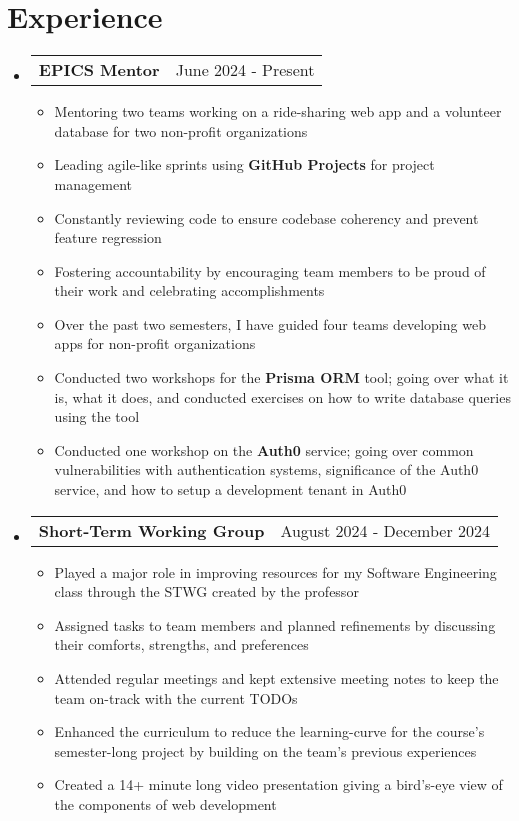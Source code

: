 \documentclass[letterpaper,11pt]{article}
\makeatletter
\newcommand{\resumeItem}[1]{
  \item\small{
    {#1 \vspace{-2pt}}
  }
}
\newcommand{\resumeProjectHeading}[2]{
    \item
    \begin{tabular*}{0.97\textwidth}{l@{\extracolsep{\fill}}r}
      \small#1 & #2 \\
    \end{tabular*}\vspace{-7pt}
}
\newcommand{\resumeSubHeadingListStart}{\begin{itemize}[leftmargin=0.15in, label={}]}
\newcommand{\resumeSubHeadingListEnd}{\end{itemize}}
\newcommand{\resumeItemListStart}{\begin{itemize}}
\newcommand{\resumeItemListEnd}{\end{itemize}\vspace{-5pt}}
\makeatother
\begin{document}
\section{Experience}
  \resumeSubHeadingListStart
    \resumeProjectHeading{\textbf{EPICS Mentor}}{June 2024 - Present}
      \resumeItemListStart
        \resumeItem{Mentoring two teams working on a ride-sharing web app and a volunteer database for two non-profit organizations}
        \resumeItem{Leading agile-like sprints using \textbf{GitHub Projects} for project management}
        \resumeItem{Constantly reviewing code to ensure codebase coherency and prevent feature regression }
        \resumeItem{Fostering accountability by encouraging team members to be proud of their work and celebrating accomplishments}
        \resumeItem{Over the past two semesters, I have guided four teams developing web apps for non-profit organizations}
        \resumeItem{Conducted two workshops for the \textbf{Prisma ORM} tool; going over what it is, what it does, and conducted exercises on how to write database queries using the tool}
        \resumeItem{Conducted one workshop on the \textbf{Auth0} service; going over common vulnerabilities with authentication systems, significance of the Auth0 service, and how to setup a development tenant in Auth0}
      \resumeItemListEnd
  \resumeSubHeadingListEnd

  \resumeSubHeadingListStart
    \resumeProjectHeading{\textbf{Short-Term Working Group}}{August 2024 - December 2024}
      \resumeItemListStart
        \resumeItem{Played a major role in improving resources for my Software Engineering class through the STWG created by the professor}
        \resumeItem{Assigned tasks to team members and planned refinements by discussing their comforts, strengths, and preferences}
        \resumeItem{Attended regular meetings and kept extensive meeting notes to keep the team on-track with the current TODOs}
        \resumeItem{Enhanced the curriculum to reduce the learning-curve for the course's semester-long project by building on the team's previous experiences}
        \resumeItem{Created a 14+ minute long video presentation giving a bird's-eye view of the components of web development}
      \resumeItemListEnd
  \resumeSubHeadingListEnd
\end{document}

